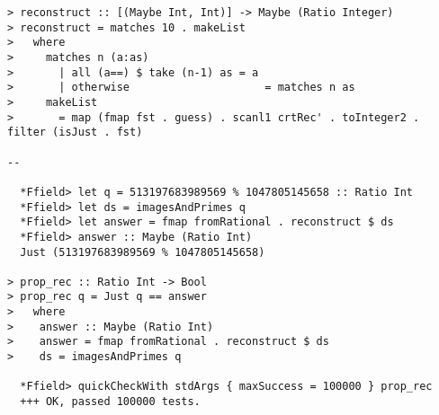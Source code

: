 \documentclass[10pt]{article}
\begin{document}
\begin{verbatim}
> reconstruct :: [(Maybe Int, Int)] -> Maybe (Ratio Integer)
> reconstruct = matches 10 . makeList
>   where
>     matches n (a:as)
>       | all (a==) $ take (n-1) as = a
>       | otherwise                     = matches n as
>     makeList 
>       = map (fmap fst . guess) . scanl1 crtRec' . toInteger2 . filter (isJust . fst)

--

  *Ffield> let q = 513197683989569 % 1047805145658 :: Ratio Int
  *Ffield> let ds = imagesAndPrimes q
  *Ffield> let answer = fmap fromRational . reconstruct $ ds
  *Ffield> answer :: Maybe (Ratio Int)
  Just (513197683989569 % 1047805145658)

> prop_rec :: Ratio Int -> Bool
> prop_rec q = Just q == answer
>   where
>    answer :: Maybe (Ratio Int)
>    answer = fmap fromRational . reconstruct $ ds
>    ds = imagesAndPrimes q

  *Ffield> quickCheckWith stdArgs { maxSuccess = 100000 } prop_rec 
  +++ OK, passed 100000 tests.
\end{verbatim}
\end{document}
